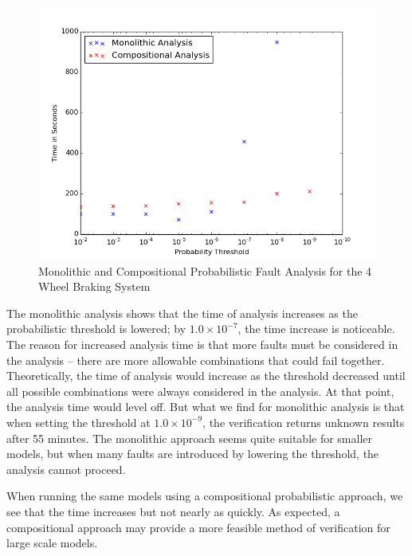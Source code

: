 \begin{figure}[htbp]
	\begin{center}
		\includegraphics[width=.7\textwidth]{images/graphProbWBS_4wheel.png}
	\end{center}
	\vspace{-0.3in}
	\caption{Monolithic and Compositional Probabilistic Fault Analysis for the 4 Wheel Braking System}
	\label{fig:graphProbWBS_4wheel}
\end{figure}

The monolithic analysis shows that the time of analysis increases as the probabilistic threshold is lowered; by $1.0 \times 10^{-7}$, the time increase is noticeable. The reason for increased analysis time is that more faults must be considered in the analysis -- there are more allowable combinations that could fail together. Theoretically, the time of analysis would increase as the threshold decreased until all possible combinations were always considered in the analysis. At that point, the analysis time would level off. But what we find for monolithic analysis is that when setting the threshold at $1.0 \times 10^{-9}$, the verification returns unknown results after 55 minutes. The monolithic approach seems quite suitable for smaller models, but when many faults are introduced by lowering the threshold, the analysis cannot proceed.

When running the same models using a compositional probabilistic approach, we see that the time increases but not nearly as quickly. As expected, a compositional approach may provide a more feasible method of verification for large scale models. 

